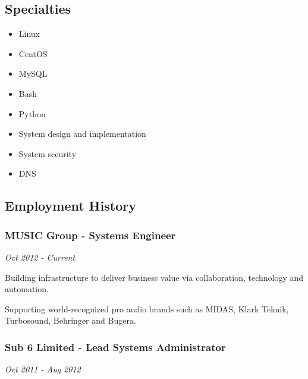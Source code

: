 \subsection{Specialties}

\begin{itemize}
\item
  Linux
\item
  CentOS
\item
  MySQL
\item
  Bash
\item
  Python
\item
  System design and implementation
\item
  System security
\item
  DNS
\end{itemize}
\subsection{Employment History}

\subsubsection{MUSIC Group - Systems Engineer}

\emph{Oct 2012 - Current}

Building infrastructure to deliver business value via collaboration,
technology and automation.

Supporting world-recognized pro audio brands such as MIDAS, Klark
Teknik, Turbosound, Behringer and Bugera.

\subsubsection{Sub 6 Limited - Lead Systems Administrator}

\emph{Oct 2011 - Aug 2012}

